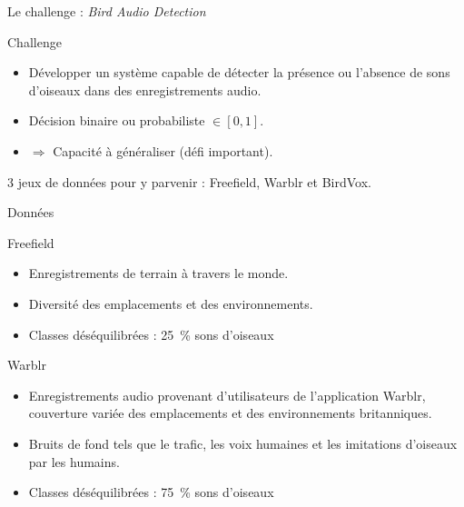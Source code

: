 \documentclass[compress,xcolor=table]{beamer}
\begin{document}
\begin{frame}{Le challenge : \textit{Bird Audio Detection}}

    \begin{block}{Challenge}
        \begin{itemize}
            \item Développer un système capable de détecter la présence ou l'absence de sons d'oiseaux dans des enregistrements audio.
            \item Décision binaire ou probabiliste $\in [0,1]$.
            \item $\Rightarrow$ Capacité à généraliser (défi important).
        \end{itemize}
    \end{block}

    3 jeux de données pour y parvenir : Freefield, Warblr et BirdVox.
    
\end{frame}

\begin{frame}{Données}

    \begin{exampleblock}{Freefield}
        \begin{itemize}
            \item Enregistrements de terrain à travers le monde.
            \item Diversité des emplacements et des environnements.
            \item \warning Classes déséquilibrées : 25~\% sons d'oiseaux
        \end{itemize}
    \end{exampleblock}

    \begin{exampleblock}{Warblr}
        \begin{itemize}
            \item Enregistrements audio provenant d'utilisateurs de l'application Warblr, couverture variée des emplacements et des environnements britanniques.
            \item Bruits de fond tels que le trafic, les voix humaines et les imitations d'oiseaux par les humains.
            \item \warning Classes déséquilibrées : 75~\% sons d'oiseaux
        \end{itemize}
    \end{exampleblock}

\end{frame}
\end{document}
